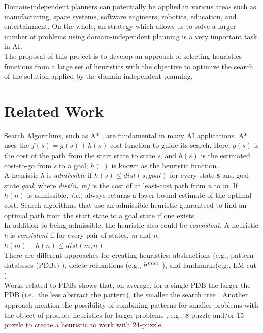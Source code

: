 \documentclass[a4paper,12pt]{article}
\begin{document}
Domain-independent planners can potentially be applied in various areas such as manufacturing, space systems, software engineers, robotics, education, and entertainment. On the whole, an strategy which allows us to solve a larger number of problems using domain-independent planning is a very important task in AI.\\

The proposal of this project is to develop an approach of selecting heuristics functions from a large set of heuristics with the objective to optimize the search of the solution applied by the domain-independent planning.

\section{Related Work}
Search Algorithms, such as A* \citep{hart1968formal}, are fundamental in many AI applications. A* uses the $f(s) = g(s) + h(s)$ cost function to guide its search. Here, $g(s)$ is the cost of the path from the start state to state \textit{s}, and $h(s)$ is the estimated cost-to-go from \textit{s} to a goal; $h(.)$ is known as the heuristic function.\\

 A heuristic \textit{h} is \textit{admissible} if $h(s) \leq dist(s, goal)$ for every state \textbf{s} and goal state \textit{goal}, where \textit{dist(n, m)} is the cost of at least-cost path from \textit{n} to \textit{m}. If $h(n)$ is admissible, \textit{i.e.,} always returns a lower bound estimate of the optimal cost. Search algorithms that use an admissible heuristic guaranteed to find an optimal path from the start state to a goal state if one exists.\\

In addition to being admissible, the heuristic also could be \textit{consistent}. A heuristic \textit{h} is \textit{consistent} if for every pair of states, \textit{m} and \textit{n}, $h(m) - h(n) \leq dist(m, n)$\\

There are different approaches for creating heuristics: abstractions (e.g., pattern databsses (PDBs) \citep{culberson1996searching}), delete relaxations (e.g., $h\sp{max}$ \citep{bonet2001planning}), and landmarks(e.g., LM-cut \citep{helmert2009landmarks}).\\

Works related to PDBs shows that, on average, for a single PDB the larger the PDB (i.e., the less abstract the pattern), the smaller the search tree \citep{holte1999space}. Another approach mention the possibility of combining patterns for smaller problems with the object of produce heuristics for larger problems \citep{culberson1998pattern}, e.g., 8-puzzle and/or 15-puzzle to create a heuristic to work with 24-puzzle.\\
\end{document}
